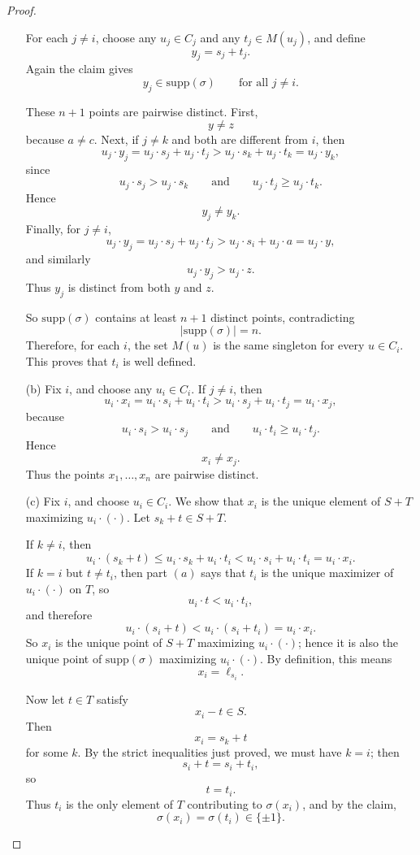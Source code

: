 \begin{proof}
\begin{enumerate}
For each $j\neq i$, choose any $u_j\in C_j$ and any $t_j\in M(u_j)$, and define
\[
y_j=s_j+t_j.
\]
Again the claim gives
\[
y_j\in \mathrm{supp}(\sigma)
\qquad
\mbox{for all } j\neq i.
\]

These $n+1$ points are pairwise distinct. First,
\[
y\neq z
\]
because $a\neq c$. Next, if $j\neq k$ and both are different from $i$, then
\[
u_j\cdot y_j
=
u_j\cdot s_j+u_j\cdot t_j
>
u_j\cdot s_k+u_j\cdot t_k
=
u_j\cdot y_k,
\]
since
\[
u_j\cdot s_j>u_j\cdot s_k
\qquad\mbox{and}\qquad
u_j\cdot t_j\ge u_j\cdot t_k.
\]
Hence
\[
y_j\neq y_k.
\]
Finally, for $j\neq i$,
\[
u_j\cdot y_j
=
u_j\cdot s_j+u_j\cdot t_j
>
u_j\cdot s_i+u_j\cdot a
=
u_j\cdot y,
\]
and similarly
\[
u_j\cdot y_j>u_j\cdot z.
\]
Thus $y_j$ is distinct from both $y$ and $z$.

So $\mathrm{supp}(\sigma)$ contains at least $n+1$ distinct points, contradicting
\[
|\mathrm{supp}(\sigma)|=n.
\]
Therefore, for each $i$, the set $M(u)$ is the same singleton for every $u\in C_i$. This proves that $t_i$ is well defined.

\item[(b)] Fix $i$, and choose any $u_i\in C_i$. If $j\neq i$, then
\[
u_i\cdot x_i
=
u_i\cdot s_i+u_i\cdot t_i
>
u_i\cdot s_j+u_i\cdot t_j
=
u_i\cdot x_j,
\]
because
\[
u_i\cdot s_i>u_i\cdot s_j
\qquad\mbox{and}\qquad
u_i\cdot t_i\ge u_i\cdot t_j.
\]
Hence
\[
x_i\neq x_j.
\]
Thus the points $x_1,\ldots,x_n$ are pairwise distinct.

\item[(c)] Fix $i$, and choose $u_i\in C_i$. We show that $x_i$ is the unique element of $S+T$ maximizing $u_i\cdot(\cdot)$. Let $s_k+t\in S+T$.

If $k\neq i$, then
\[
u_i\cdot(s_k+t)
\le u_i\cdot s_k+u_i\cdot t_i
< u_i\cdot s_i+u_i\cdot t_i
= u_i\cdot x_i.
\]
If $k=i$ but $t\neq t_i$, then part $(a)$ says that $t_i$ is the unique maximizer of $u_i\cdot(\cdot)$ on $T$, so
\[
u_i\cdot t<u_i\cdot t_i,
\]
and therefore
\[
u_i\cdot(s_i+t)<u_i\cdot(s_i+t_i)=u_i\cdot x_i.
\]
So $x_i$ is the unique point of $S+T$ maximizing $u_i\cdot(\cdot)$; hence it is also the unique point of $\mathrm{supp}(\sigma)$ maximizing $u_i\cdot(\cdot)$. By definition, this means
\[
x_i=\ell_{s_i}.
\]

Now let $t\in T$ satisfy
\[
x_i-t\in S.
\]
Then
\[
x_i=s_k+t
\]
for some $k$. By the strict inequalities just proved, we must have $k=i$; then
\[
s_i+t=s_i+t_i,
\]
so
\[
t=t_i.
\]
Thus $t_i$ is the only element of $T$ contributing to $\sigma(x_i)$, and by the claim,
\[
\sigma(x_i)=\sigma(t_i)\in\{\pm1\}.
\]


\end{enumerate}
\end{proof}
